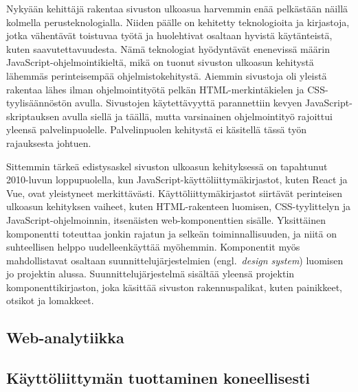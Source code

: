 \documentclass[finnish, 12pt, a4paper, elec, utf8, a-1b, online]{aaltothesis}
\begin{document}
Nykyään kehittäjä rakentaa sivuston ulkoasua harvemmin enää pelkästään näillä
kolmella perusteknologialla. Niiden päälle on kehitetty teknologioita ja
kirjastoja, jotka vähentävät toistuvaa työtä ja huolehtivat osaltaan hyvistä
käytänteistä, kuten saavutettavuudesta. Nämä teknologiat hyödyntävät enenevissä
määrin JavaScript-ohjelmointikieltä, mikä on tuonut sivuston ulkoasun kehitystä
lähemmäs perinteisempää ohjelmistokehitystä. Aiemmin sivustoja oli yleistä
rakentaa lähes ilman ohjelmointityötä pelkän HTML-merkintäkielen ja
CSS-tyylisäännöstön avulla. Sivustojen käytettävyyttä parannettiin kevyen
JavaScript-skriptauksen avulla siellä ja täällä, mutta varsinainen
ohjelmointityö rajoittui yleensä palvelinpuolelle. Palvelinpuolen kehitystä ei
käsitellä tässä työn rajauksesta johtuen.

Sittemmin tärkeä edistysaskel sivuston ulkoasun kehityksessä on tapahtunut
2010-luvun loppupuolella, kun JavaScript-käyttöliittymäkirjastot, kuten React ja
Vue, ovat yleistyneet merkittävästi. Käyttöliittymäkirjastot siirtävät
perinteisen ulkoasun kehityksen vaiheet, kuten HTML-rakenteen luomisen,
CSS-tyylittelyn ja JavaScript-ohjelmoinnin, itsenäisten web-komponenttien
sisälle. Yksittäinen komponentti toteuttaa jonkin rajatun ja selkeän
toiminnallisuuden, ja niitä on suhteellisen helppo uudelleenkäyttää myöhemmin.
Komponentit myös mahdollistavat osaltaan suunnittelujärjestelmien
(engl.~\textit{design system}) luomisen jo projektin alussa.
Suunnittelujärjestelmä sisältää yleensä projektin komponenttikirjaston, joka
käsittää sivuston rakennuspalikat, kuten painikkeet, otsikot ja lomakkeet.


\subsection{Web-analytiikka}

\subsection{Käyttöliittymän tuottaminen koneellisesti}


\clearpage
\end{document}
